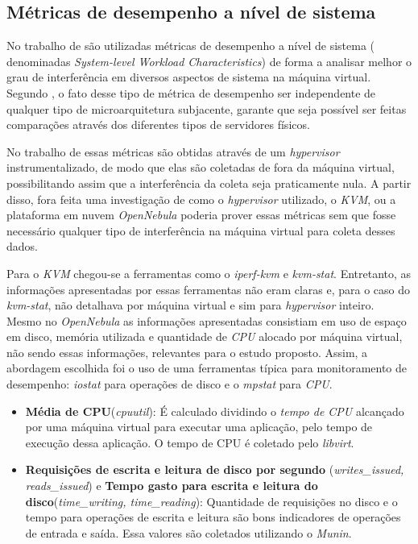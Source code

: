 \subsection{Métricas de desempenho a nível de sistema}
No trabalho de  são utilizadas métricas de desempenho a nível de sistema ( denominadas \textit{System-level Workload Characteristics}) de forma a analisar melhor o grau de interferência em diversos aspectos de sistema na máquina virtual. Segundo , o fato desse tipo de métrica de desempenho ser independente de qualquer tipo de microarquitetura subjacente, garante que seja possível ser feitas comparações através dos diferentes tipos de servidores físicos.

No trabalho de  essas métricas são obtidas através de um \textit{hypervisor} instrumentalizado, de modo que elas são coletadas de fora da máquina virtual, possibilitando assim que a interferência da coleta seja praticamente nula. A partir disso, fora feita uma investigação de como o \textit{hypervisor} utilizado, o \textit{KVM}, ou a plataforma em nuvem \textit{OpenNebula} poderia prover essas métricas sem que fosse necessário qualquer tipo de interferência na máquina virtual para coleta desses dados.

Para o \textit{KVM} chegou-se a ferramentas como o \textit{iperf-kvm} e \textit{kvm-stat}. Entretanto, as informações apresentadas por essas ferramentas não eram claras e, para o caso do \textit{kvm-stat}, não detalhava por máquina virtual e sim para  \textit{hypervisor} inteiro. Mesmo no \textit{OpenNebula} as informações apresentadas consistiam em uso de espaço em disco, memória utilizada e quantidade de \textit{CPU} alocado por máquina virtual, não sendo essas informações, relevantes para o estudo proposto. Assim, a abordagem escolhida foi o uso de uma ferramentas típica para monitoramento de desempenho: \textit{iostat} para operações de disco e o \textit{mpstat} para \textit{CPU}. %

\begin{itemize}
\item \textbf{Média de CPU}(\textit{cpuutil}): É calculado dividindo o \textit{tempo de CPU} alcançado por uma máquina virtual para executar uma aplicação, pelo tempo de execução dessa aplicação. O tempo de CPU é coletado pelo \textit{libvirt}.

\item \textbf{Requisições de escrita e leitura de disco por segundo }(\textit{writes\_issued, reads\_issued}) e \textbf{Tempo gasto para escrita e leitura do disco}(\textit{time\_writing, time\_reading}): Quantidade de requisições no disco e o tempo para operações de escrita e leitura são bons indicadores de operações de entrada e saída. Essa valores são coletados utilizando o \textit{Munin}.

\end{itemize}

